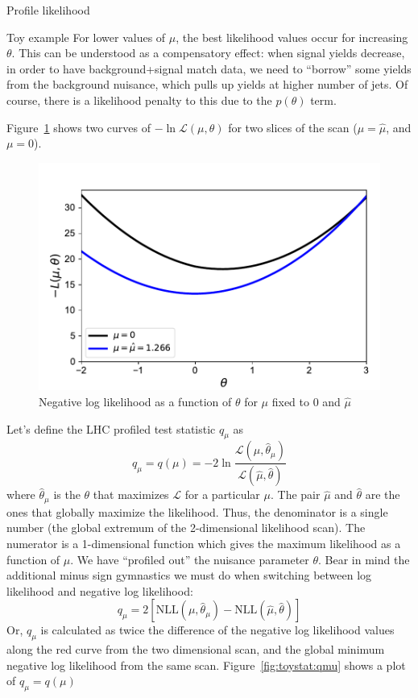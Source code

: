 \begin{section}{Profile likelihood}
\begin{subsection}{Toy example}
For lower values of $\mu$, the best likelihood values occur
for increasing $\theta$. This can be understood as a compensatory effect: when
signal yields decrease, in order to have background+signal match data,
we need to ``borrow'' some yields from the background nuisance, which
pulls up yields at higher number of jets. Of course, there is a likelihood penalty
to this due to the $p(\theta)$ term.

Figure~\ref{fig:toystat:theta} shows two curves of
$-\ln\mathcal{L}(\mu,\theta)$ for two
slices of the scan ($\mu=\hat{\mu}$, and $\mu=0$).

\begin{figure}[!htb]
    \centering
    \includegraphics[width=0.80\linewidth]{figs/toy_statistics/likelihood_vs_theta.pdf}
    \caption{
Negative log likelihood as a function of $\theta$ for $\mu$ fixed to 0 and $\hat{\mu}$
    }
    \label{fig:toystat:theta}
\end{figure}

Let's define the LHC profiled test statistic $q_\mu$ as 
\begin{equation}\label{eq:qmu}
q_\mu = q(\mu) = -2\ln\frac{\mathcal{L}(\mu,\hat{\theta}_\mu)}{\mathcal{L}(\hat{\mu},\hat{\theta})}
\end{equation}
 where $\hat{\theta}_\mu$ is the $\theta$ that maximizes
$\mathcal{L}$ for a particular $\mu$. The pair $\hat{\mu}$ and
$\hat{\theta}$ are the ones that globally maximize the likelihood.
Thus, the denominator is a single number (the global extremum of the
2-dimensional likelihood scan). The numerator is a 1-dimensional function
which gives the maximum likelihood as a function of $\mu$. We have
``profiled out'' the nuisance parameter $\theta$. Bear in mind the
additional minus sign gymnastics we must do when switching between log
likelihood and negative log likelihood: 
\begin{equation}
q_\mu = 2\left[\mathrm{NLL}(\mu,\hat{\theta}_\mu) - \mathrm{NLL}(\hat{\mu},\hat{\theta})\right]
\end{equation}
 Or, $q_\mu$ is calculated as twice the difference of the negative log likelihood values
along the red curve from the two dimensional scan, and the global minimum negative log likelihood
from the same scan. Figure~\ref{fig:toystat:qmu} shows a plot of $q_\mu = q(\mu)$


\end{subsection}
\end{section}
